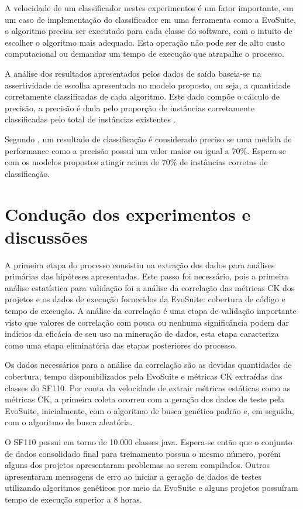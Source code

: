 \documentclass[
	12pt,				%
	oneside,			%
	a4paper,			%
	english,			%
	brazil				%
	]{abntex2ppgsi}
\begin{document}
A velocidade de um classificador nestes experimentos é um fator importante, em um caso de implementação do classificador em uma ferramenta como a EvoSuite, o algoritmo precisa ser executado para cada classe do software, com o intuito de escolher o algoritmo mais adequado. Esta operação não pode ser de alto custo computacional ou demandar um tempo de execução que atrapalhe o processo.

A análise dos resultados apresentados pelos dados de saída baseia-se na assertividade de escolha apresentada no modelo proposto, ou seja, a quantidade corretamente classificadas de cada algoritmo. Este dado compõe o cálculo de precisão, a precisão é dada pelo proporção de instâncias corretamente classificadas pelo total de instâncias existentes \cite{Kaur2014}.

Segundo \cite{Kaur2014}, um resultado de classificação é considerado preciso se uma medida de performance como a precisão possui um valor maior ou igual a 70\%. Espera-se com os modelos propostos atingir acima de 70\% de instâncias corretas de classificação.



 \chapter{Condução dos experimentos e discussões}
 \label{chap:resultados}
  A primeira etapa do processo consistiu na  extração dos dados para análises primárias das hipóteses apresentadas. Este passo foi necessário, pois a primeira análise estatística  para validação foi a análise da correlação das métricas CK dos projetos e os dados de execução fornecidos da EvoSuite: cobertura de código e tempo de execução. A análise da correlação é uma etapa de validação importante visto que valores de correlação com pouca ou nenhuma significância podem dar indícios da eficácia de seu uso na mineração de dados, esta etapa caracteriza como uma etapa eliminatória das etapas posteriores do processo. 
  
 Os dados necessários para a análise da correlação são as devidas quantidades de cobertura, tempo disponibilizados pela EvoSuite e métricas CK extraídas das classes do SF110. Por conta da velocidade de extrair métricas estáticas como as métricas CK, a primeira coleta ocorreu com a geração dos dados de teste pela EvoSuite, inicialmente, com o algoritmo de busca genético padrão e, em seguida,  com o algoritmo de busca aleatória.
 
 O SF110 possui em torno de 10.000 classes java. Espera-se então que o conjunto de dados consolidado final para treinamento possua o mesmo número, porém alguns dos projetos apresentaram problemas ao serem compilados. Outros apresentaram mensagens de erro ao iniciar a geração de dados de testes utilizando algoritmos genéticos por meio da EvoSuite e alguns projetos possuíram tempo de execução superior a 8 horas.
\end{document}
